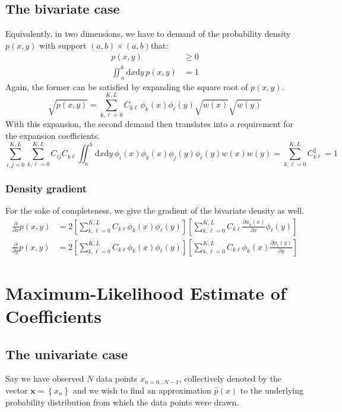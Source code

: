 \documentclass[]{report}
\begin{document}
	\section{The bivariate case}
	Equivalently, in two dimensions, we have to demand of the probability density $p(x,y)$ with support $(a,b)\times(a,b)$that:
	\begin{align}
		p(x, y) & \ge 0 \\
		\iint_a^b\mathrm{d}x\mathrm{d}y\,p(x,y) & = 1 
	\end{align}
	Again, the former can be satisfied by expanding the square root of $p(x,y)$.
	\begin{equation}
		\sqrt{p(x,y)} = \sum_{k, \ell=0}^{K, L}C_{k\ell}\,\phi_k(x)\phi_\ell(y)\sqrt{w(x)}\sqrt{w(y)}
	\end{equation}
	With this expansion, the second demand then translates into a requirement for the expansion coefficients.
	\begin{equation}
		\sum_{i, j=0}^{K, L}\sum_{k, \ell=0}^{K, L}C_{ij}C_{k\ell} \iint_a^b\mathrm{d}x\mathrm{d}y\,\phi_i(x)\phi_k(x)\phi_j(y)\phi_\ell(y)w(x)w(y) = \sum_{k, \ell=0}^{K, L}C_{k\ell}^2 = 1
	\end{equation}
	
		\subsection{Density gradient}
		For the sake of completeness, we give the gradient of the bivariate density as well.
		\begin{align}
			\frac{\partial}{\partial x}p(x, y) & = 2\left[\sum_{k,\ell=0}^{K,L}C_{k\ell}\phi_k(x)\phi_\ell(y)\right]\left[\sum_{k,\ell=0}^{K,L}C_{k\ell}\frac{\partial\phi_k(x)}{\partial x}\phi_\ell(y)\right] \\
			\frac{\partial}{\partial y}p(x, y) & = 2\left[\sum_{k,\ell=0}^{K,L}C_{k\ell}\phi_k(x)\phi_\ell(y)\right]\left[\sum_{k,\ell=0}^{K,L}C_{k\ell}\phi_k(x)\frac{\partial\phi_\ell(y)}{\partial y}\right] \nonumber
		\end{align}

\chapter{Maximum-Likelihood Estimate of Coefficients}
	\section{The univariate case}
	Say we have observed $N$ data points $x_{n=0\ldots N-1}$, collectively denoted by the vector $\mathbf{x}=\left\{x_n\right\}$ and we wish to find an approximation $\hat{p}(x)$ to the underlying probability distribution from which the data points were drawn.
	
\end{document}
